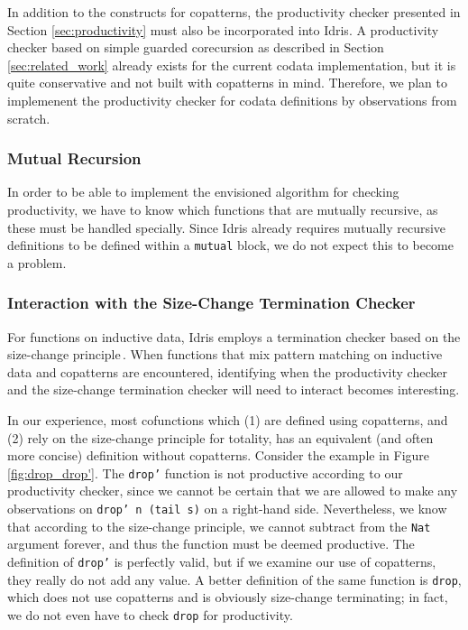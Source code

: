
In addition to the constructs for copatterns, the productivity checker presented in Section \ref{sec:productivity} must also be incorporated into Idris. A productivity checker based on simple guarded corecursion as described in Section \ref{sec:related_work} already exists for the current codata implementation, but it is quite conservative and not built with copatterns in mind. Therefore, we plan to implemenent the productivity checker for codata definitions by observations from scratch.

\subsubsection{Mutual Recursion}
In order to be able to implement the envisioned algorithm for checking productivity, we have to know which functions that are mutually recursive, as these must be handled specially. Since Idris already requires mutually recursive definitions to be defined within a \texttt{mutual} block, we do not expect this to become a problem.

\subsubsection{Interaction with the Size-Change Termination Checker}
For functions on inductive data, Idris employs a termination checker based on the size-change principle\,\citep{LeeJones01SizeChange}. When functions that mix pattern matching on inductive data and copatterns are encountered, identifying when the productivity checker and the size-change termination checker will need to interact becomes interesting.

In our experience, most cofunctions which (1) are defined using copatterns, and (2) rely on the size-change principle for totality, has an equivalent (and often more concise) definition without copatterns. Consider the example in Figure \ref{fig:drop_drop'}. The \texttt{drop'} function is not productive according to our productivity checker, since we cannot be certain that we are allowed to make any observations on \texttt{drop' n (tail s)} on a right-hand side. Nevertheless, we know that according to the size-change principle, we cannot subtract from the \texttt{Nat} argument forever, and thus the function must be deemed productive. The definition of \texttt{drop'} is perfectly valid, but if we examine our use of copatterns, they really do not add any value. A better definition of the same function is \texttt{drop}, which does not use copatterns and is obviously size-change terminating; in fact, we do not even have to check \texttt{drop} for productivity. 

